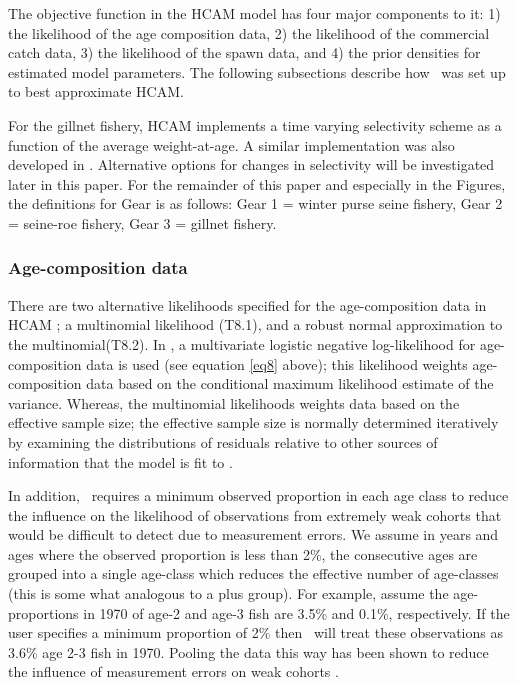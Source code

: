 	The objective function in the HCAM model has four major components to it: 1) the likelihood of the age composition data, 2) the likelihood of the commercial catch data, 3) the likelihood of the spawn data, and 4) the prior densities for estimated model parameters.  The following subsections describe  how  \iscam\ was set up to best approximate  HCAM.
	
	For the gillnet fishery, HCAM implements a time varying selectivity scheme as a function of the average weight-at-age. A similar implementation was also developed in \iscam. Alternative options for changes in selectivity will be investigated  later in this paper.  For the remainder of this paper and especially in the Figures, the definitions for Gear is as follows:  Gear 1 = winter purse seine fishery, Gear 2 = seine-roe fishery, Gear 3 = gillnet fishery.
	
	
\subsubsection{Age-composition data}
There are two alternative likelihoods specified for the age-composition data in  HCAM  \citep[see Table 8 in Appendix B in][]{Clear2010};  a multinomial likelihood (T8.1), and a robust normal approximation to the multinomial(T8.2).  In  \iscam, a multivariate logistic negative log-likelihood for age-composition data is used (see equation \ref{eq8} above); this likelihood weights age-composition data based on the conditional maximum likelihood estimate of the variance.  Whereas, the multinomial likelihoods weights data based on the effective sample size; the effective sample size is normally determined iteratively by examining the distributions of residuals relative to other sources of information that the model is fit to \citep[see][for full details]{gavaris2002sif}.

  In addition, \iscam\ requires a minimum observed proportion in each age class to reduce the influence on the likelihood of observations from extremely weak cohorts that would be difficult to detect due to measurement errors. We assume in years and ages where the observed proportion is less than 2\%,  the consecutive ages are grouped into a single age-class which reduces the effective number of age-classes (this is some what analogous to a plus group).  For example, assume the age-proportions in 1970 of age-2 and age-3 fish are 3.5\% and 0.1\%, respectively. If the user specifies a minimum proportion of 2\% then \iscam\ will treat these observations as 3.6\% age 2-3 fish in 1970.  Pooling the data this way has been shown to reduce the influence of measurement errors on weak cohorts \citep{richards1997visualizing}.

